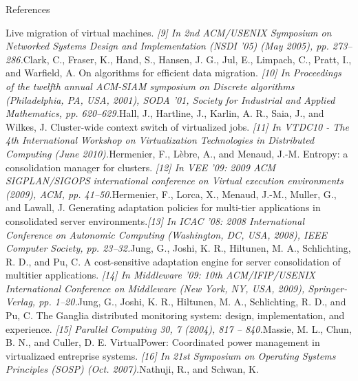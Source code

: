 \begin{frame}[allowframebreaks]{References}
\begin{thebibliography}{2}
{\beamertemplatearticlebibitems {} Live migration of virtual machines. \newblock\emph{[9]  In 2nd ACM/USENIX Symposium on Networked Systems Design and Implementation (NSDI ’05) (May 2005), pp. 273–286.}\newblock Clark, C., Fraser, K., Hand, S., Hansen, J. G., Jul, E., Limpach, C., Pratt, I., and Warfield, A.
\beamertemplatearticlebibitems {} On algorithms for efficient data migration. \newblock\emph{[10] In Proceedings of the twelfth annual ACM-SIAM symposium on Discrete algorithms (Philadelphia, PA, USA, 2001), SODA ’01, Society for Industrial and Applied Mathematics, pp. 620–629.}\newblock Hall, J., Hartline, J., Karlin, A. R., Saia, J., and Wilkes, J. 
\beamertemplatearticlebibitems {} Cluster-wide context switch of virtualized jobs. \newblock\emph{[11] In VTDC10 - The 4th International Workshop on Virtualization Technologies in Distributed Computing (June 2010).}\newblock Hermenier, F., Lèbre, A., and Menaud, J.-M. 
\beamertemplatearticlebibitems {} Entropy: a consolidation manager for clusters. \newblock\emph{[12] In VEE ’09: 2009 ACM SIGPLAN/SIGOPS international conference on Virtual execution environments (2009), ACM, pp. 41–50.}\newblock Hermenier, F., Lorca, X., Menaud, J.-M., Muller, G., and Lawall, J. 
\beamertemplatearticlebibitems {} Generating adaptation policies for multi-tier applications in consolidated server environments.\newblock\emph{[13]  In ICAC ’08: 2008 International Conference on Autonomic Computing (Washington, DC, USA, 2008), IEEE Computer Society, pp. 23–32.}\newblock Jung, G., Joshi, K. R., Hiltunen, M. A., Schlichting, R. D., and Pu, C. 
\beamertemplatearticlebibitems {} A cost-sensitive adaptation engine for server consolidation of multitier applications. \newblock\emph{[14]  In Middleware ’09: 10th ACM/IFIP/USENIX International Conference on Middleware (New York, NY, USA, 2009), Springer-Verlag, pp. 1–20.}\newblock Jung, G., Joshi, K. R., Hiltunen, M. A., Schlichting, R. D., and Pu, C.
\beamertemplatearticlebibitems {} The Ganglia distributed monitoring system: design, implementation, and experience. \newblock\emph{[15]  Parallel Computing 30, 7 (2004), 817 – 840.}\newblock Massie, M. L., Chun, B. N., and Culler, D. E.
\beamertemplatearticlebibitems {} VirtualPower: Coordinated power management in virtualizaed entreprise systems. \newblock\emph{[16] In 21st Symposium on Operating Systems Principles (SOSP) (Oct. 2007).}\newblock Nathuji, R., and Schwan, K. 
}
\end{thebibliography}
\end{frame}
